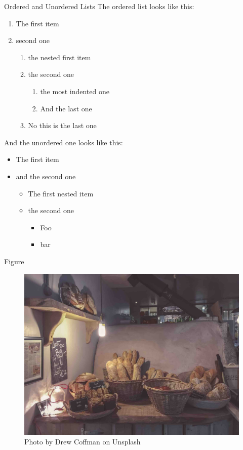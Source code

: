 \documentclass[10pt]{beamer}
\begin{document}
\begin{frame}{Ordered and Unordered Lists}
  The ordered list looks like this:
  \begin{enumerate}
    \item The first item
    \item second one
          \begin{enumerate}
            \item the nested first item
            \item the second one
                  \begin{enumerate}
                    \item the most indented one
                    \item And the last one
                  \end{enumerate}
            \item No this is the last one
          \end{enumerate}
  \end{enumerate}

  And the unordered one looks like this:
  \begin{itemize}
    \item The first item
    \item and the second one
          \begin{itemize}
            \item The first nested item
            \item the second one
                  \begin{itemize}
                    \item Foo
                    \item bar
                  \end{itemize}
          \end{itemize}
  \end{itemize}
\end{frame}

\begin{frame}{Figure}
  \begin{figure}
    \centering
    \includegraphics[width=.7\linewidth]{images/drew-coffman-Azli_kcxRNE-unsplash.jpg}
    \caption{Photo by Drew Coffman on Unsplash}
    \label{fig:breads-by-drew-coffman}
  \end{figure}
\end{frame}
\end{document}
